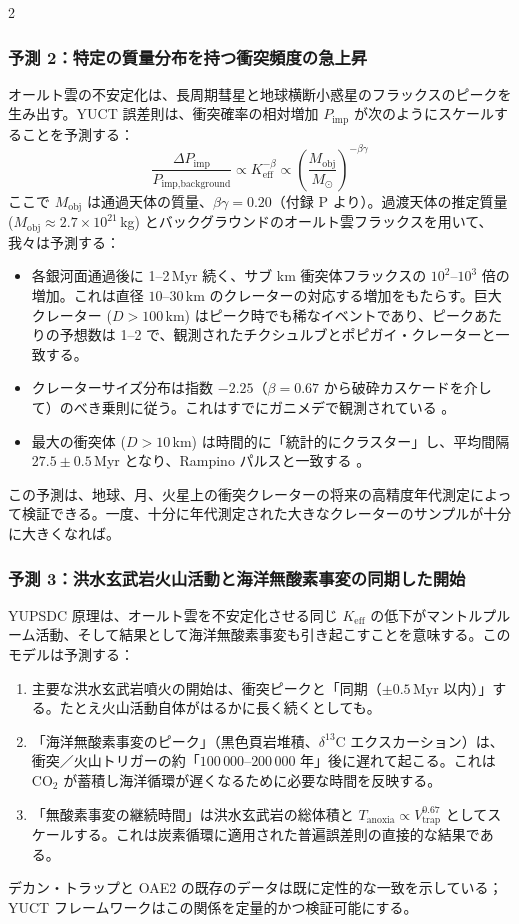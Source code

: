 \documentclass[12pt,a4paper]{article}
\begin{document}
\begin{multicols}{2}
		\subsubsection{予測 2：特定の質量分布を持つ衝突頻度の急上昇}
		オールト雲の不安定化は、長周期彗星と地球横断小惑星のフラックスのピークを生み出す。YUCT 誤差則は、衝突確率の相対増加 \(P_{\text{imp}}\) が次のようにスケールすることを予測する：
		\[
		\frac{\Delta P_{\text{imp}}}{P_{\text{imp,background}}} \propto K_{\mathrm{eff}}^{-\beta} \propto \left(\frac{M_{\text{obj}}}{M_{\odot}}\right)^{-\beta\gamma}
		\]
		ここで \(M_{\text{obj}}\) は通過天体の質量、\(\beta\gamma = 0.20\)（付録 P より）。過渡天体の推定質量 (\(M_{\text{obj}} \approx 2.7\times10^{21}\) kg) とバックグラウンドのオールト雲フラックスを用いて、我々は予測する：
		\begin{itemize}
			\item 各銀河面通過後に 1–2 Myr 続く、サブ km 衝突体フラックスの \(10^{2}\)–\(10^{3}\) 倍の増加。これは直径 \(10\)–\(30\) km のクレーターの対応する増加をもたらす。巨大クレーター (\(D>100\) km) はピーク時でも稀なイベントであり、ピークあたりの予想数は 1–2 で、観測されたチクシュルブとポピガイ・クレーターと一致する。
			\item クレーターサイズ分布は指数 \(-2.25\)（\(\beta=0.67\) から破砕カスケードを介して）のべき乗則に従う。これはすでにガニメデで観測されている \cite{Schenk2004}。
			\item 最大の衝突体 (\(D>10\) km) は時間的に「統計的にクラスター」し、平均間隔 \(27.5 \pm 0.5\) Myr となり、Rampino パルスと一致する \cite{Rampino2021}。
		\end{itemize}
		この予測は、地球、月、火星上の衝突クレーターの将来の高精度年代測定によって検証できる。一度、十分に年代測定された大きなクレーターのサンプルが十分に大きくなれば。
		
		\subsubsection{予測 3：洪水玄武岩火山活動と海洋無酸素事変の同期した開始}
		YUPSDC 原理は、オールト雲を不安定化させる同じ \(K_{\mathrm{eff}}\) の低下がマントルプルーム活動、そして結果として海洋無酸素事変も引き起こすことを意味する。このモデルは予測する：
		\begin{enumerate}
			\item 主要な洪水玄武岩噴火の開始は、衝突ピークと「同期（\(\pm 0.5\) Myr 以内）」する。たとえ火山活動自体がはるかに長く続くとしても。
			\item 「海洋無酸素事変のピーク」（黒色頁岩堆積、\(\delta^{13}\)C エクスカーション）は、衝突／火山トリガーの約「\(100\,000\)–\(200\,000\) 年」後に遅れて起こる。これは CO\(_2\) が蓄積し海洋循環が遅くなるために必要な時間を反映する。
			\item 「無酸素事変の継続時間」は洪水玄武岩の総体積と \(T_{\text{anoxia}} \propto V_{\text{trap}}^{0.67}\) としてスケールする。これは炭素循環に適用された普遍誤差則の直接的な結果である。
		\end{enumerate}
		デカン・トラップと OAE2 の既存のデータは既に定性的な一致を示している；YUCT フレームワークはこの関係を定量的かつ検証可能にする。
		

\end{multicols}
\end{document}
